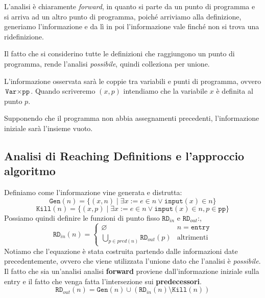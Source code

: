 L'analisi è chiaramente \textit{forward}, in quanto si parte da un punto di programma e
si arriva ad un altro punto di programma, poiché arriviamo alla definizione,
generiamo l'informazione e da lì in poi l'informazione vale finché non si trova una ridefinizione.

Il fatto che si considerino tutte le definizioni che raggiungono un punto di programma, 
rende l'analisi \textit{possibile}, quindi colleziona per unione.

L'informazione osservata sarà le coppie tra variabili e punti di programma, ovvero
$\texttt{Var} \times \texttt{pp}$. Quando scriveremo $(x, p)$ intendiamo che la variabile $x$
è definita al punto $p$.

Supponendo che il programma non abbia assegnamenti precedenti, l'informazione iniziale sarà 
l'insieme vuoto.

\subsection{Analisi di Reaching Definitions e l'approccio algoritmo}
Definiamo come l'informazione vine generata e distrutta:
\begin{equation}
    \texttt{Gen}(n) = \{ (x, n) \mid \exists x := e \in n \lor \texttt{input}(x) \in n \}
\end{equation}
\begin{equation}
    \texttt{Kill}(n) = \{ (x, p) \mid \exists x := e \in n  \lor \texttt{input}(x) \in n, p \in \texttt{pp} \}
\end{equation}
Possiamo quindi definire le funzioni di punto fisso $\texttt{RD}_{in}$ e $\texttt{RD}_{out}$:,
\begin{equation}
    \texttt{RD}_{in}(n) = 
    \begin{cases}
        \varnothing & n = \texttt{entry} \\
        \bigcup_{p \in pred(n)} \texttt{RD}_{out}(p) & \text{altrimenti}
    \end{cases}
\end{equation}
Notiamo che l'equazione è stata costruita partendo dalle informazioni date precedentemente, ovvero che viene
utilizzata l'unione dato che l'analisi è \textit{possibile}. Il fatto che sia un'analisi analisi
\textbf{forward} proviene dall'informazione iniziale sulla entry 
e il fatto che venga fatta l'intersezione sui \textbf{predecessori}.
\begin{equation}
    \texttt{RD}_{out}(n) = \texttt{Gen}(n) \cup (\texttt{RD}_{in}(n) \setminus \texttt{Kill}(n))
\end{equation}
